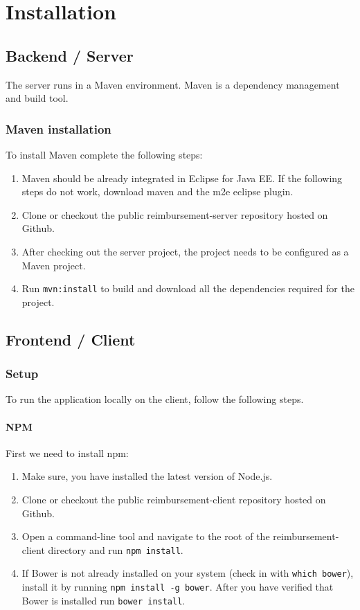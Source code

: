 \appendix

\chapter{Installation}
\label{chap:installation}

\section{Backend / Server}
\label{sec:backend-server}

The server runs in a Maven environment. Maven is a dependency management and build tool.

\subsection{Maven installation}
To install Maven complete the following steps:

\begin{enumerate}
    \item Maven should be already integrated in Eclipse for Java EE. If the following steps do not work, download maven and the m2e eclipse plugin.
    \item Clone or checkout the public reimbursement-server repository hosted on Github.
    \item After checking out the server project, the project needs to be configured as a Maven project.
    \item Run \texttt{mvn:install} to build and download all the dependencies required for the project. 
\end{enumerate}


\section{Frontend / Client}

\subsection{Setup}
To run the application locally on the client, follow the following steps.

\subsubsection{NPM}
First we need to install npm:
\begin{enumerate}
  \item Make sure, you have installed the latest version of Node.js.
  \item Clone or checkout the public reimbursement-client repository hosted on Github.
  \item Open a command-line tool and navigate to the root of the reimbursement-client directory and run \texttt{npm install}.
  \item If Bower is not already installed on your system (check in with \texttt{which bower}), install it by running \texttt{npm install -g bower}. After you have verified that Bower is installed run \texttt{bower install}.
\end{enumerate}

